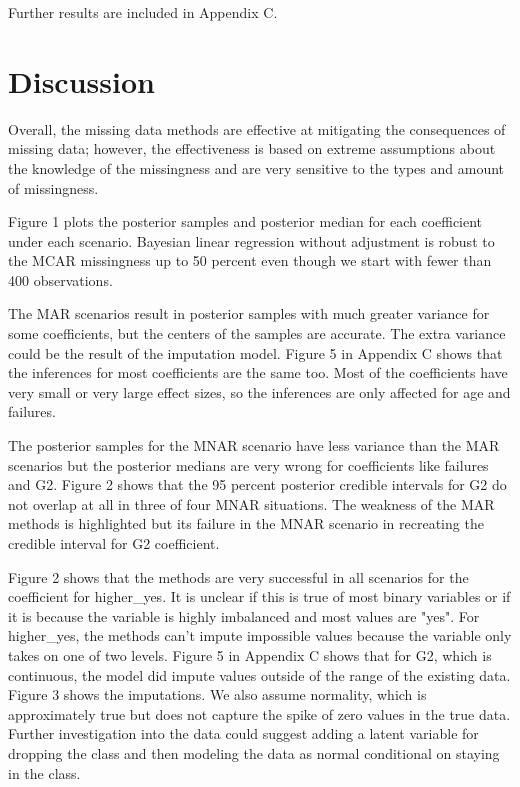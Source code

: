 \documentclass[11pt]{article}
\begin{document}
Further results are included in Appendix C. 

\section{Discussion}

Overall, the missing data methods are effective at mitigating the consequences of missing data; however, the effectiveness is based on extreme assumptions about the knowledge of the missingness and are very sensitive to the types and amount of missingness. 

Figure 1 plots the posterior samples and posterior median for each coefficient under each scenario. Bayesian linear regression without adjustment is robust to the MCAR missingness up to 50 percent even though we start with fewer than 400 observations. 

The MAR scenarios result in posterior samples with much greater variance for some coefficients, but the centers of the samples are accurate. The extra variance could be the result of the imputation model. Figure 5 in Appendix C shows that the inferences for most coefficients are the same too. Most of the coefficients have very small or very large effect sizes, so the inferences are only affected for age and failures.

The posterior samples for the MNAR scenario have less variance than the MAR scenarios but the posterior medians are very wrong for coefficients like failures and G2. Figure 2 shows that the 95 percent posterior credible intervals for G2 do not overlap at all in three of four MNAR situations. The weakness of the MAR methods is highlighted but its failure in the MNAR scenario in recreating the credible interval for G2 coefficient.  

Figure 2 shows that the methods are very successful in all scenarios for the coefficient for higher\_yes. It is unclear if this is true of most binary variables or if it is because the variable is highly imbalanced and most values are "yes". For higher\_yes, the methods can't impute impossible values because the variable only takes on one of two levels. Figure 5 in Appendix C shows that for G2, which is continuous, the model did impute values outside of the range of the existing data. Figure 3 shows the imputations. We also assume normality, which is approximately true but does not capture the spike of zero values in the true data. Further investigation into the data could suggest adding a latent variable for dropping the class and then modeling the data as normal conditional on staying in the class. 
\end{document}
